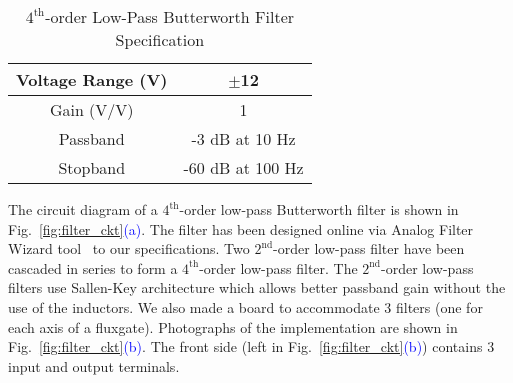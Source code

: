 \begin{table} [!htb]
    \centering
    \begin{tabular} { |c|c| } 
        \hline
        Voltage Range (V) & $\pm$12\\ 
        \hline
        Gain (V/V) & 1 \\ 
        \hline
        Passband & -3 dB at 10 Hz\\ 
        \hline
        Stopband & -60 dB at 100 Hz\\
         \hline
    \end{tabular}
    \caption{$\mathrm{4^{th}}$-order Low-Pass Butterworth Filter Specification}\label{table:butter}
\end{table}

The circuit diagram of a $\mathrm{4^{th}}$-order low-pass Butterworth filter is shown in Fig.~\ref{fig:filter_ckt}\textcolor{blue}{(a)}. The filter has been designed online via Analog Filter Wizard tool~\cite{fWizard} to our specifications. Two $\mathrm{2^{nd}}$-order low-pass filter have been cascaded in series to form a $\mathrm{4^{th}}$-order low-pass filter. The $\mathrm{2^{nd}}$-order low-pass filters use Sallen-Key architecture which allows better passband gain without the use of the inductors. We also made a board to accommodate 3 filters (one for each axis of a fluxgate). Photographs of the implementation are shown in Fig.~\ref{fig:filter_ckt}\textcolor{blue}{(b)}. The front side (left in Fig.~\ref{fig:filter_ckt}\textcolor{blue}{(b)}) contains 3 input and output terminals.





